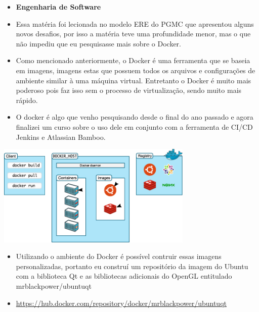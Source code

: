 \documentclass[10pt]{beamer}
\theoremstyle{remark}
\theoremstyle{definition}
\begin{document}
\begin{frame}[allowframebreaks]
	\framebreak
	
	\begin{itemize}

		\item \textbf{Engenharia de Software}
		
		\item Essa matéria foi lecionada no modelo ERE do PGMC que apresentou alguns novos desafios, por isso a matéria teve uma profundidade menor, mas o que não impediu que eu pesquisasse mais sobre o Docker.
		
		\item Como mencionado anteriormente, o Docker é uma ferramenta que se baseia em imagens, imagens estas que possuem todos os arquivos e configurações de ambiente similar à uma máquina virtual. Entretanto o Docker é muito mais poderoso pois faz isso sem o processo de virtualização, sendo muito mais rápido.
		
		\item O docker é algo que venho pesquisando desde o final do ano passado e agora finalizei um curso sobre o uso dele em conjunto com a ferramenta de CI/CD Jenkins e Atlassian Bamboo.
		
	\end{itemize}
	
	\framebreak
	
	\begin{center}
		\includegraphics[width=0.7\textwidth]{images/01.png}
	\end{center}
	
	
	\framebreak
	
	\begin{itemize}
		\item Utilizando o ambiente do Docker é possível contruir essas imagens personalizadas, portanto eu construí um repositório da imagem do Ubuntu com a biblioteca Qt e as bibliotecas adicionais do OpenGL entitulado mrblackpower/ubuntuqt
		
		\item \href{https://hub.docker.com/repository/docker/mrblackpower/ubuntuqt}{https://hub.docker.com/repository/docker/mrblackpower/ubuntuqt}
		

\end{itemize}
\end{frame}
\end{document}
